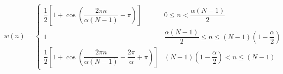 \documentclass[../main.tex]{subfiles}%
\begin{document}
%
    \Xequation%
    \begin{equation}%
        w(n)%
        =%
        \left\{%
            \begin{array}{cl}%
            \dfrac{1}{2} \left[ 1 + \cos\left( \dfrac{2 \pi n}{\alpha(N - 1)} - \pi \right) \right]%
            &%
            0 \leq n < \dfrac{\alpha (N - 1)}{2}%
            \\[2ex]%
            1%
            &%
            \dfrac{\alpha (N - 1)}{2} \leq n \leq (N - 1)(1 - \dfrac{\alpha}{2})%
            \\[2ex]%
            \dfrac{1}{2} \left[ 1 + \cos\left( \dfrac{2 \pi n}{\alpha(N - 1)} - \dfrac{2 \pi}{\alpha} + \pi \right) \right]%
            &%
            (N - 1)(1 - \dfrac{\alpha}{2}) < n \leq (N - 1)%
            \end{array}%
        \right.%
        \label{eq:tukey-window}%
    \end{equation}%
\end{document}
